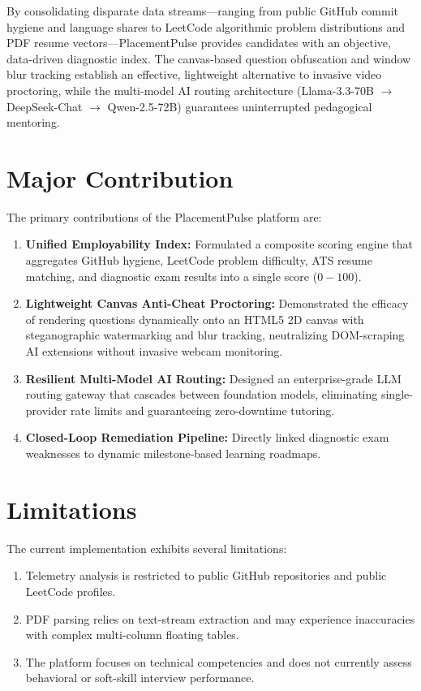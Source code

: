 \documentclass[12pt,a4paper]{report}
\begin{document}
By consolidating disparate data streams—ranging from public GitHub commit hygiene and language shares to LeetCode algorithmic problem distributions and PDF resume vectors—PlacementPulse provides candidates with an objective, data-driven diagnostic index. The canvas-based question obfuscation and window blur tracking establish an effective, lightweight alternative to invasive video proctoring, while the multi-model AI routing architecture (Llama-3.3-70B $\rightarrow$ DeepSeek-Chat $\rightarrow$ Qwen-2.5-72B) guarantees uninterrupted pedagogical mentoring.

\section{Major Contribution}
The primary contributions of the PlacementPulse platform are:
\begin{enumerate}
    \item \textbf{Unified Employability Index:} Formulated a composite scoring engine that aggregates GitHub hygiene, LeetCode problem difficulty, ATS resume matching, and diagnostic exam results into a single score ($0-100$).
    \item \textbf{Lightweight Canvas Anti-Cheat Proctoring:} Demonstrated the efficacy of rendering questions dynamically onto an HTML5 2D canvas with steganographic watermarking and blur tracking, neutralizing DOM-scraping AI extensions without invasive webcam monitoring.
    \item \textbf{Resilient Multi-Model AI Routing:} Designed an enterprise-grade LLM routing gateway that cascades between foundation models, eliminating single-provider rate limits and guaranteeing zero-downtime tutoring.
    \item \textbf{Closed-Loop Remediation Pipeline:} Directly linked diagnostic exam weaknesses to dynamic milestone-based learning roadmaps.
\end{enumerate}

\section{Limitations}
The current implementation exhibits several limitations:
\begin{enumerate}
    \item Telemetry analysis is restricted to public GitHub repositories and public LeetCode profiles.
    \item PDF parsing relies on text-stream extraction and may experience inaccuracies with complex multi-column floating tables.
    \item The platform focuses on technical competencies and does not currently assess behavioral or soft-skill interview performance.
\end{enumerate}
\end{document}
